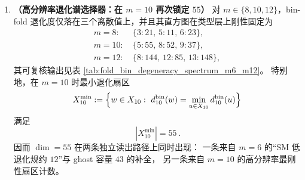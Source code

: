 \begin{enumerate}
  \item \textbf{（高分辨率退化谱选择器：在 \(m=10\) 再次锁定 \(55\)）}
  对 \(m\in\{8,10,12\}\)，bin-fold 退化度仅落在三个离散值上，并且其直方图在类型层上刚性固定为
  \[
  \begin{aligned}
  m=8:\ &\{3:21,\,5:11,\,6:23\},\\
  m=10:\ &\{5:55,\,8:52,\,9:37\},\\
  m=12:\ &\{8:144,\,12:85,\,13:148\},
  \end{aligned}
  \]
  其可复核输出见表 \ref{tab:fold_bin_degeneracy_spectrum_m6_m12}。
  特别地，在 \(m=10\) 时最小退化扇区
  \[
  X^{\min}_{10}:=\Bigl\{w\in X_{10}:\ d^{\mathrm{bin}}_{10}(w)=\min_{u\in X_{10}} d^{\mathrm{bin}}_{10}(u)\Bigr\}
  \]
  满足
  \[
  \boxed{\ |X^{\min}_{10}|=55\ }.
  \]
  因而 \(\dim=55\) 在两条独立读出路径上同时出现：
  一条来自 \(m=6\) 的“SM 低退化规约 \(12\)”与 ghost 容量 \(43\) 的补全，
  另一条来自 \(m=10\) 的高分辨率最刚性扇区计数。
  
\end{enumerate}

